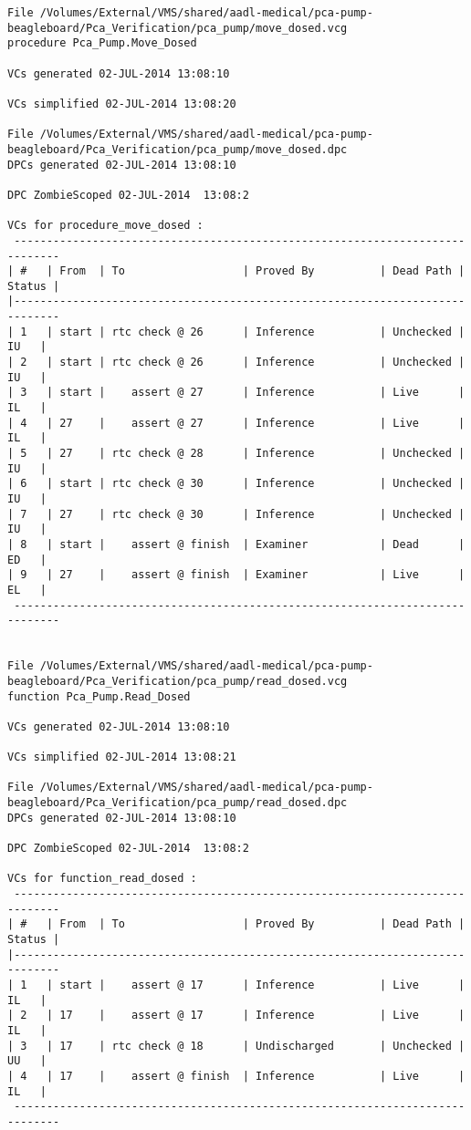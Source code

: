 \begin{lstlisting}[frame=single, gobble=0, caption={Second POGS report}, label={listing:pcapump_dosemonitor_pogs2}]
File /Volumes/External/VMS/shared/aadl-medical/pca-pump-beagleboard/Pca_Verification/pca_pump/move_dosed.vcg
procedure Pca_Pump.Move_Dosed

VCs generated 02-JUL-2014 13:08:10

VCs simplified 02-JUL-2014 13:08:20

File /Volumes/External/VMS/shared/aadl-medical/pca-pump-beagleboard/Pca_Verification/pca_pump/move_dosed.dpc
DPCs generated 02-JUL-2014 13:08:10

DPC ZombieScoped 02-JUL-2014  13:08:2

VCs for procedure_move_dosed :
 -----------------------------------------------------------------------------
| #   | From  | To                  | Proved By          | Dead Path | Status |
|-----------------------------------------------------------------------------
| 1   | start | rtc check @ 26      | Inference          | Unchecked |   IU   |
| 2   | start | rtc check @ 26      | Inference          | Unchecked |   IU   |
| 3   | start |    assert @ 27      | Inference          | Live      |   IL   |
| 4   | 27    |    assert @ 27      | Inference          | Live      |   IL   |
| 5   | 27    | rtc check @ 28      | Inference          | Unchecked |   IU   |
| 6   | start | rtc check @ 30      | Inference          | Unchecked |   IU   |
| 7   | 27    | rtc check @ 30      | Inference          | Unchecked |   IU   |
| 8   | start |    assert @ finish  | Examiner           | Dead      |   ED   |
| 9   | 27    |    assert @ finish  | Examiner           | Live      |   EL   |
 -----------------------------------------------------------------------------


File /Volumes/External/VMS/shared/aadl-medical/pca-pump-beagleboard/Pca_Verification/pca_pump/read_dosed.vcg
function Pca_Pump.Read_Dosed

VCs generated 02-JUL-2014 13:08:10

VCs simplified 02-JUL-2014 13:08:21

File /Volumes/External/VMS/shared/aadl-medical/pca-pump-beagleboard/Pca_Verification/pca_pump/read_dosed.dpc
DPCs generated 02-JUL-2014 13:08:10

DPC ZombieScoped 02-JUL-2014  13:08:2

VCs for function_read_dosed :
 -----------------------------------------------------------------------------
| #   | From  | To                  | Proved By          | Dead Path | Status |
|-----------------------------------------------------------------------------
| 1   | start |    assert @ 17      | Inference          | Live      |   IL   |
| 2   | 17    |    assert @ 17      | Inference          | Live      |   IL   |
| 3   | 17    | rtc check @ 18      | Undischarged       | Unchecked |   UU   |
| 4   | 17    |    assert @ finish  | Inference          | Live      |   IL   |
 -----------------------------------------------------------------------------



\end{lstlisting}
